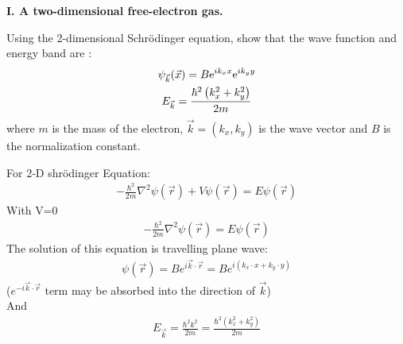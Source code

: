 \documentclass[answers]{exam}
\begin{document}
\textbf{I. A two-dimensional free-electron gas.}
\begin{questions}
\question Using the 2-dimensional Schr\"odinger equation, show that the wave function and energy band are :
\begin{gather*}
\psi_{\vec{k}}(\vec{x}) =B \mathrm{e}^{i k_{x} x} \mathrm{e}^{i k_{y} y}\notag \\
E_{\vec{k}} =\frac{\hbar^{2}\left(k_{x}^{2}+k_{y}^{2}\right)}{2 m}\notag   
\end{gather*}
where $m$ is the mass of the electron, $\vec{k} = (k_{x}, k_{y})$ is the wave vector and $B$ is the normalization constant.
\begin{solution}
For  2-D  shr\"odinger Equation:
\begin{align*}
-\frac{\hbar^{2}}{2 m} \nabla^{2} \psi(\vec{r})+V \psi(\vec{r})=E \psi(\vec{r})
\end{align*}
With  V=0 
\begin{align*}
-\frac{\hbar^{2}}{2 m} \nabla^{2} \psi(\vec{r})=E \psi(\vec{r})
\end{align*}
The solution of this equation is travelling plane wave:
\begin{align*}
\psi(\vec{r})=B e^{i \vec{k} \cdot \vec{r}}=B e^{i\left(k_{x} \cdot x+k_{y} \cdot y\right)}
\end{align*}
($e^{-i \vec{k} \cdot \vec{r}}$ term may be absorbed into the direction of $\vec{k}$)\\
And
\begin{align*}
E_{\vec{k}}=\frac{\hbar^{2} k^{2}}{2 m}=\frac{\hbar^{2}\left(k_{x}^{2}+k_{y}^{2}\right)}{2 m}
\end{align*}
\end{solution}


\end{questions}
\end{document}
